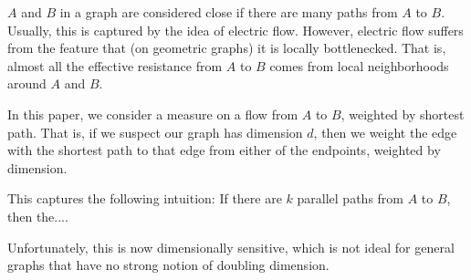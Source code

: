 $A$ and $B$ in a graph are considered close if there are many
paths from $A$ to $B$. Usually, this is captured by the idea of
electric flow. However, electric flow suffers from the feature
that (on geometric graphs) it is locally bottlenecked.
That is,
almost all the effective resistance from $A$ to $B$ comes from
local neighborhoods around $A$ and $B$.

In this paper, we consider a measure on a flow from $A$ to $B$,
weighted by shortest path. That is, if we suspect our graph
has dimension $d$, then we weight the edge with the shortest path
to that edge from either of the endpoints, weighted by dimension.

This captures the following intuition: If there are $k$ parallel
paths from $A$ to $B$, then the....

Unfortunately, this is now dimensionally sensitive, which is not
ideal for general graphs that have no strong notion of doubling
dimension.
